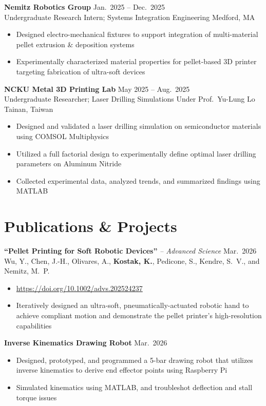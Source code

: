 \documentclass[a4paper, 10pt]{article}
\newcommand{\entrygap}{\vspace{5pt}}
\newcommand{\role}[1]{\textcolor{accent}{#1}}
\begin{document}
\textbf{Nemitz Robotics Group} \hfill Jan.\ 2025 -- Dec.\ 2025\\[1pt]
\role{Undergraduate Research Intern; Systems Integration Engineering} \hfill \role{Medford, MA}
\begin{itemize}
  \item Designed electro-mechanical fixtures to support integration of multi-material pellet extrusion \& deposition systems
  \item Experimentally characterized material properties for pellet-based 3D printer targeting fabrication of ultra-soft devices
\end{itemize}
\entrygap

\textbf{NCKU Metal 3D Printing Lab} \hfill May 2025 -- Aug.\ 2025\\[1pt]
\role{Undergraduate Researcher; Laser Drilling Simulations Under Prof.\ Yu-Lung Lo} \hfill \role{Tainan, Taiwan}
\begin{itemize}
  \item Designed and validated a laser drilling simulation on semiconductor materials using COMSOL Multiphysics
  \item Utilized a full factorial design to experimentally define optimal laser drilling parameters on Aluminum Nitride
  \item Collected experimental data, analyzed trends, and summarized findings using MATLAB
\end{itemize}

\section{Publications \& Projects}

\textbf{``Pellet Printing for Soft Robotic Devices''} \textit{-- Advanced Science} \hfill Mar.\ 2026\\[1pt]
\role{Wu, Y., Chen, J.-H., Olivares, A., \textbf{Kostak, K.}, Pedicone, S., Kendre, S.\ V., and Nemitz, M.\ P.}
\begin{itemize}
  \item \href{https://doi.org/10.1002/advs.202524237}{https://doi.org/10.1002/advs.202524237}
  \item Iteratively designed an ultra-soft, pneumatically-actuated robotic hand to achieve compliant motion and demonstrate the pellet printer's high-resolution capabilities
\end{itemize}
\entrygap

\textbf{Inverse Kinematics Drawing Robot} \hfill Mar.\ 2026
\begin{itemize}
  \item Designed, prototyped, and programmed a 5-bar drawing robot that utilizes inverse kinematics to derive end effector points using Raspberry Pi
  \item Simulated kinematics using MATLAB, and troubleshot deflection and stall torque issues
\end{itemize}
\end{document}
